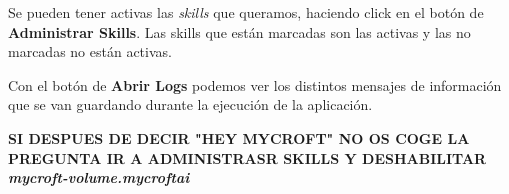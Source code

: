 Se pueden tener activas las \textit{skills} que queramos, haciendo click en el botón de \textbf{Administrar Skills}. Las skills que están marcadas son las activas y las no marcadas no están activas.

Con el botón de \textbf{Abrir Logs} podemos ver los distintos mensajes de información que se van guardando durante la ejecución de la aplicación.

\textbf{SI DESPUES DE DECIR "HEY MYCROFT" NO OS COGE LA PREGUNTA IR A ADMINISTRASR SKILLS Y DESHABILITAR \textit{mycroft-volume.mycroftai}}